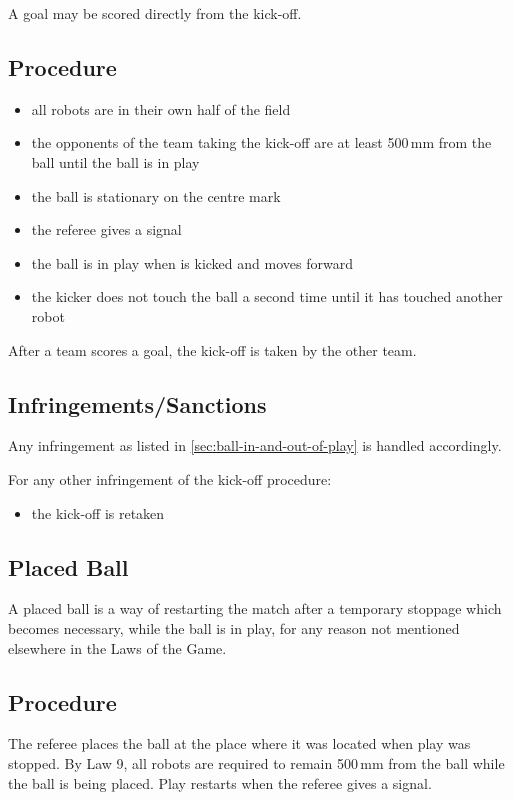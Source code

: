 A goal may be scored directly from the kick-off.

\subsection{Procedure}
\begin{itemize}
\item all robots are in their own half of the field
\item the opponents of the team taking the kick-off are at least 500\,mm from the ball until the ball is in play
\item the ball is stationary on the centre mark
\item the referee gives a signal
\item the ball is in play when is kicked and moves forward
\item the kicker does not touch the ball a second time until it has touched another robot
\end{itemize}

After a team scores a goal, the kick-off is taken by the other team.

\subsection{Infringements/Sanctions}
Any infringement as listed in \autoref{sec:ball-in-and-out-of-play} is handled accordingly.

For any other infringement of the kick-off procedure:
\begin{itemize}
\item the kick-off is retaken
\end{itemize}

\subsection{Placed Ball}
A placed ball is a way of restarting the match after a temporary stoppage which becomes necessary, while the ball is in play, for any reason not mentioned elsewhere in the Laws of the Game.

\subsection{Procedure}
The referee places the ball at the place where it was located when play was stopped.
By Law 9, all robots are required to remain 500\,mm from the ball while the ball is being placed.
Play restarts when the referee gives a signal.

